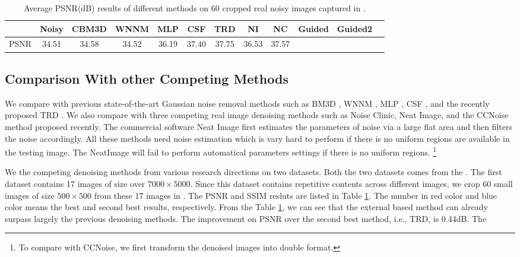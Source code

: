 \documentclass[10pt,twocolumn,letterpaper]{article}
\begin{document}
\begin{table}\label{tab1}
\caption{Average PSNR(dB) results of different methods on 60 cropped real noisy images captured in \cite{crosschannel2016}.}
\label{tab1}
\begin{center}
\renewcommand\arraystretch{1}
\begin{tabular}{|c||c|c|c|c|c|c|c|c|c|c|c|}
\hline
 & \textbf{Noisy} &\textbf{CBM3D}&\textbf{WNNM}&\textbf{MLP}&\textbf{CSF}&\textbf{TRD}& \textbf{NI}& \textbf{NC} &\textbf{Guided}  &\textbf{Guided2} 
\\
\hline
PSNR & 34.51 & 34.58 & 34.52 & 36.19 & 37.40 & 37.75 & 36.53 & 37.57 &  {\color{blue}{38.72}} & {\color{red}{ 38.90}}
\\
\hline
\end{tabular}
\end{center}
\end{table}

\subsection{Comparison With other Competing Methods}
We compare with previous state-of-the-art Gaussian noise removal methods such as BM3D \cite{bm3d}, WNNM \cite{wnnm}, MLP \cite{mlp}, CSF \cite{csf}, and the recently proposed TRD \cite{chen2015learning}. We also compare with three competing real image denoising methods such as Noise Clinic, Neat Image, and the CCNoise method proposed recently.  The commercial software Neat Image \cite{neatimage} first estimates the parameters of noise via a large flat area and then filters the noise accordingly. All these methods need noise estimation which is vary hard to perform if there is no uniform regions are available in the testing image. The NeatImage will fail to perform automatical parameters settings if there is no uniform regions. \footnote{To compare with CCNoise, we first transform the denoised images into double format.}

We the competing denoising methods from various research directions on two datasets. Both the two datasets comes from the \cite{crosschannel2016}. The first dataset contains 17 images of size over $7000\times5000$. Since this dataset contains repetitive contents across different images, we crop 60 small images of size $500\times500$ from these 17 images in \cite{crosschannel2016}. The PSNR and SSIM resluts are listed in Table \ref{tab1}. The number in red color and blue color means the best and second best results, respectively. From the Table \ref{tab1}, we can see that the external based method can already surpass largely the previous denoising methods. The improvement on PSNR over the second best method, i.e., TRD, is 0.44dB. The 
\end{document}
